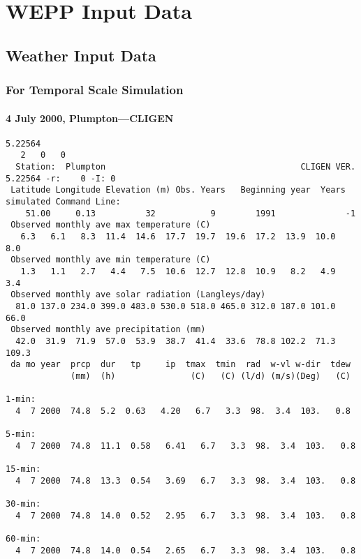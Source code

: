 \chapter{WEPP Input Data}
\label{sec:WEPPInputData}

\section{Weather Input Data}
\label{sec:WEPPWeatherInputData}

\subsection{For Temporal Scale Simulation}
\label{sec:ForTemporalScaleTests}

\subsubsection{4 July 2000, Plumpton---CLIGEN}
\label{sec:DitchlingRoadTemporalScaleSimulationCLIGEN}
\scriptsize

\begin{verbatim}
5.22564
   2   0   0
  Station:  Plumpton                                       CLIGEN VER. 5.22564 -r:    0 -I: 0
 Latitude Longitude Elevation (m) Obs. Years   Beginning year  Years simulated Command Line:
    51.00     0.13          32           9        1991              -1          
 Observed monthly ave max temperature (C)
   6.3   6.1   8.3  11.4  14.6  17.7  19.7  19.6  17.2  13.9  10.0   8.0
 Observed monthly ave min temperature (C)
   1.3   1.1   2.7   4.4   7.5  10.6  12.7  12.8  10.9   8.2   4.9   3.4
 Observed monthly ave solar radiation (Langleys/day)
  81.0 137.0 234.0 399.0 483.0 530.0 518.0 465.0 312.0 187.0 101.0  66.0
 Observed monthly ave precipitation (mm)
  42.0  31.9  71.9  57.0  53.9  38.7  41.4  33.6  78.8 102.2  71.3 109.3
 da mo year  prcp  dur   tp     ip  tmax  tmin  rad  w-vl w-dir  tdew
             (mm)  (h)               (C)   (C) (l/d) (m/s)(Deg)   (C)

1-min:
  4  7 2000  74.8  5.2  0.63   4.20   6.7   3.3  98.  3.4  103.   0.8

5-min:
  4  7 2000  74.8  11.1  0.58   6.41   6.7   3.3  98.  3.4  103.   0.8
  
15-min:
  4  7 2000  74.8  13.3  0.54   3.69   6.7   3.3  98.  3.4  103.   0.8
  
30-min:
  4  7 2000  74.8  14.0  0.52   2.95   6.7   3.3  98.  3.4  103.   0.8

60-min:
  4  7 2000  74.8  14.0  0.54   2.65   6.7   3.3  98.  3.4  103.   0.8
\end{verbatim}

